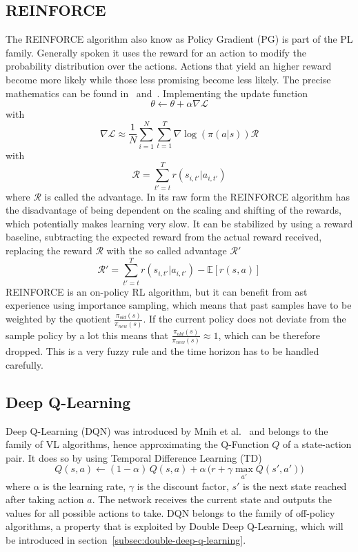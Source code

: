 \documentclass[11pt,a4paper]{article}
\begin{document}
	\subsection{REINFORCE}\label{subsec:policy-gradient}
	The REINFORCE algorithm also know as Policy Gradient (PG) is part of the PL family.
	Generally spoken it uses the reward for an action to modify the probability distribution over the actions.
	Actions that yield an higher reward become more likely while those less promising become less likely.
	The precise mathematics can be found in~\cite{sutton_introduction_1998} and~\cite{williams_simple_1992}.
	Implementing the update function
	\[\theta \leftarrow \theta + \alpha \nabla \mathcal{L}\]
	with
	\[\nabla \mathcal{L} \approx \frac{1}{N} \sum^N_{i=1} \sum^T_{t=1} \nabla \log(\pi(a|s))\mathcal{R}\]
	with
	\[ \mathcal{R} = \sum_{t'=t}^T r(s_{i, t'}|a_{i, t'}) \]
	where $\mathcal{R}$ is called the advantage.
	In its raw form the REINFORCE algorithm has the disadvantage of being dependent on the scaling and shifting of the rewards, which potentially makes learning very slow.
	It can be stabilized by using a reward baseline, subtracting the expected reward from the actual reward received, replacing the reward $\mathcal{R}$ with the so called advantage $\mathcal{R}'$
	\begin{equation}\label{eq:advantage}
		\mathcal{R}' = \sum_{t'=t}^T r(s_{i, t'}|a_{i, t'}) - \mathbb{E}[r(s, a)]
	\end{equation}
	REINFORCE is an on-policy RL algorithm, but it can benefit from ast experience using importance sampling, which means that past samples have to be weighted by the quotient $\frac{\pi_{old}(s)}{\pi_{new}(s)}$.
	If the current policy does not deviate from the sample policy by a lot this means that $\frac{\pi_{old}(s)}{\pi_{new}(s)} \approx 1$, which can be therefore dropped.
	This is a very fuzzy rule and the time horizon has to be handled carefully.

	\subsection{Deep Q-Learning}\label{subsec:deep-q-learning}
	Deep Q-Learning (DQN) was introduced by Mnih et al.~\cite{mnih_human-level_2015} and belongs to the family of VL algorithms, hence approximating the Q-Function $Q$ of a state-action pair.
	It does so by using Temporal Difference Learning (TD)
	\[Q(s,a) \leftarrow (1-\alpha)\, Q(s,a) + \alpha\,\Big(r + \gamma \max_{a'}Q(s', a')\Big)\]
	where $\alpha$ is the learning rate, $\gamma$ is the discount factor, $s'$ is the next state reached after taking action $a$.
	The network receives the current state and outputs the values for all possible actions to take.
	DQN belongs to the family of off-policy algorithms, a property that is exploited by Double Deep Q-Learning, which will be introduced in section~\ref{subsec:double-deep-q-learning}.
	
\end{document}
